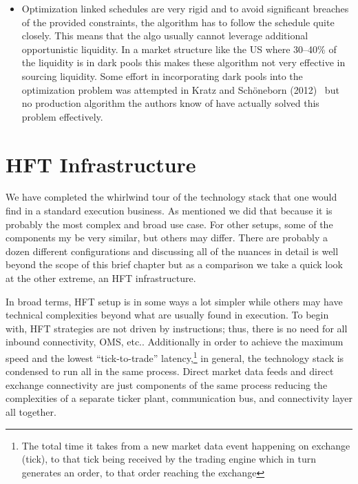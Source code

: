 \begin{itemize}
\item Optimization linked schedules are very rigid and to avoid significant breaches of the provided constraints, the algorithm has to follow the schedule quite closely. This means that the algo usually cannot leverage additional opportunistic liquidity. In a market structure like the US where 30--40\% of the liquidity is in dark pools this makes these algorithm not very effective in sourcing liquidity. Some effort in incorporating dark pools into the optimization problem was attempted in Kratz and Sch\"oneborn (2012)~\cite{kratzschon} but no production algorithm the authors know of have actually solved this problem effectively. 
\end{itemize}



\section{HFT Infrastructure}

We have completed the whirlwind tour of the technology stack that one would find in a standard execution business. As mentioned we did  that because it is probably the most complex and broad use case. For other setups, some of the components my be very similar, but others may differ. There are probably a dozen different configurations and discussing all of the nuances in detail is well beyond the scope of this brief chapter but as a comparison we take a quick look at the other extreme, an HFT infrastructure.


In broad terms, HFT setup is in some ways a lot simpler while others may have technical complexities beyond what are usually found in execution. To begin with, HFT strategies are not driven by instructions; thus, there is no need for all inbound connectivity, OMS, etc..  Additionally in order to achieve the maximum speed and the lowest  ``tick-to-trade'' latency,\footnote{The total time it takes from a new market data event happening on exchange (tick), to that tick being received by the trading engine which in turn generates an order, to that order reaching the exchange} in general, the technology stack is condensed to run all in the same process. Direct market data feeds and direct exchange connectivity are just components of the same process reducing the complexities of a separate ticker plant, communication bus, and connectivity layer all together. 


